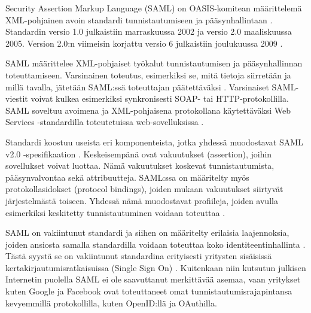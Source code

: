 Security Assertion Markup Language (SAML) on OASIS-komitean määrittelemä XML-pohjainen avoin standardi tunnistautumiseen ja pääsynhallintaan \cite{saml_spec}. Standardin versio 1.0 julkaistiin marraskuussa 2002 ja versio 2.0 maaliskuussa 2005. Version 2.0:n viimeisin korjattu versio 6 julkaistiin joulukuussa 2009 \cite{saml_spec}.

SAML määrittelee XML-pohjaiset työkalut tunnistautumisen ja pääsynhallinnan toteuttamiseen. Varsinainen toteutus, esimerkiksi se, mitä tietoja siirretään ja millä tavalla, jätetään SAML:ssä toteuttajan päätettäväksi \cite{dynamic_saml}. Varsinaiset SAML-viestit voivat kulkea esimerkiksi synkronisesti SOAP- tai HTTP-protokollilla. SAML soveltuu avoimena ja XML-pohjaisena protokollana käytettäväksi Web Services -standardilla toteutetuissa web-sovelluksissa \cite{dynamic_saml}.

Standardi koostuu useista eri komponenteista, jotka yhdessä muodostavat SAML v2.0 -spesifikaation \cite{saml_spec}. Keskeisempänä ovat vakuutukset (assertion), joihin sovellukset voivat luottaa. Nämä vakuutukset koskevat tunnistautumista, pääsynvalvontaa sekä attribuutteja. SAML:ssa on määritelty myös protokollasidokset (protocol bindings), joiden mukaan vakuutukset siirtyvät järjestelmästä toiseen. Yhdessä nämä muodostavat profiileja, joiden avulla esimerkiksi keskitetty tunnistautuminen voidaan toteuttaa \cite{saml_spec}.

SAML on vakiintunut standardi ja siihen on määritelty erilaisia laajennoksia, joiden ansiosta samalla standardilla voidaan toteuttaa koko identiteentinhallinta \cite{saml_spec}. Tästä syystä se on vakiintunut standardina erityisesti yritysten sisäisissä kertakirjautumisratkaisuissa (Single Sign On) \cite{dynamic_saml}. Kuitenkaan niin kutsutun julkisen Internetin puolella SAML ei ole saavuttanut merkittävää asemaa, vaan yritykset kuten Google ja Facebook ovat toteuttaneet omat tunnistautumisrajapintansa kevyemmillä protokollilla, kuten OpenID:llä ja OAuthilla.